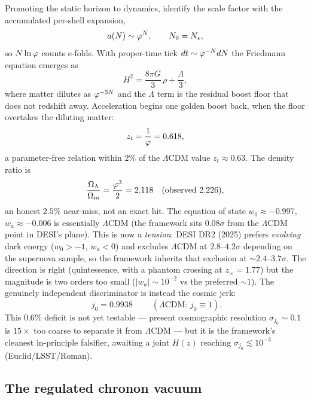 Promoting the static horizon to dynamics, identify the scale factor with the accumulated per-shell expansion,
\begin{equation}
a(N)\sim\varphi^{N},\qquad N_0=N_{\star} ,
\label{eq:cosmo:scalefactor}
\end{equation}
so $N\ln\varphi$ counts e-folds. With proper-time tick $dt\sim\varphi^{-N}dN$ the Friedmann equation emerges as
\begin{equation}
H^2=\frac{8\pi G}{3}\,\rho+\frac{\Lambda}{3},
\label{eq:cosmo:friedmann}
\end{equation}
where matter dilutes as $\varphi^{-3N}$ and the $\Lambda$ term is the residual boost floor that does not redshift away. Acceleration begins one golden boost back, when the floor overtakes the diluting matter:
\begin{equation}
z_t=\frac{1}{\varphi}=0.618 ,
\label{eq:cosmo:zt}
\end{equation}
a parameter-free relation within $2\%$ of the $\Lambda$CDM value $z_t\approx0.63$. The density ratio is
\begin{equation}
\frac{\Omega_\Lambda}{\Omega_m}=\frac{\varphi^{3}}{2}=2.118
\quad(\text{observed }2.226),
\label{eq:cosmo:omega}
\end{equation}
an honest $2.5\%$ near-miss, not an exact hit. The equation of state $w_0\approx-0.997$, $w_a\approx-0.006$ is essentially $\Lambda$CDM (the framework sits $0.08\sigma$ from the $\Lambda$CDM point in DESI's plane). This is now a \emph{tension}: DESI DR2 (2025) prefers \emph{evolving} dark energy ($w_0>-1$, $w_a<0$) and excludes $\Lambda$CDM at $2.8$--$4.2\sigma$ depending on the supernova sample, so the framework inherits that exclusion at $\sim2.4$--$3.7\sigma$. The direction is right (quintessence, with a phantom crossing at $z_\times=1.77$) but the magnitude is two orders too small ($|w_a|\sim10^{-2}$ vs the preferred $\sim1$). The genuinely independent discriminator is instead the cosmic jerk:
\begin{equation}
\boxed{\;j_0=0.9938\;}\qquad(\text{$\Lambda$CDM: }j_0\equiv1).
\label{eq:cosmo:jerk}
\end{equation}
This $0.6\%$ deficit is not yet testable --- present cosmographic resolution $\sigma_{j_0}\sim0.1$ is $15\times$ too coarse to separate it from $\Lambda$CDM --- but it is the framework's cleanest in-principle falsifier, awaiting a joint $H(z)$ reaching $\sigma_{j_0}\lesssim10^{-3}$ (Euclid/LSST/Roman).

\subsection{The regulated chronon vacuum}

